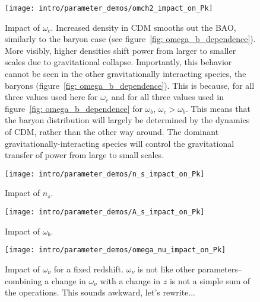 \begin{figure}[htb]
  \centering
  \texttt{[image: intro/parameter\_demos/omch2\_impact\_on\_Pk]}
  \caption[Impact of $\omega_c$ on $P(k)$]{Impact of $\omega_c$. Increased
  	density in CDM smooths out the BAO, similarly to the baryon case
  	(see figure~\ref{fig: omega_b_dependence}). More visibly, higher
  	densities shift power from larger to smaller scales due to gravitational 
  	collapse. Importantly, this behavior cannot be seen in the other
  	gravitationally interacting species, the baryons
  	(figure~\ref{fig: omega_b_dependence}). This is because, for all three
  	values used here for $\omega_c$ and for all three values used in
  	figure~\ref{fig: omega_b_dependence} for $\omega_b$,
  	$\omega_c > \omega_b$. This means that the baryon distribution will
  	largely be determined by the dynamics of CDM, rather than the
  	other way around. The dominant gravitationally-interacting species will
  	control the gravitational transfer of power from large to small scales.}
  \label{fig: omega_c_dependence}
\end{figure}


\begin{figure}[htb]
  \centering
  \texttt{[image: intro/parameter\_demos/n\_s\_impact\_on\_Pk]}
  \caption[Impact of $n_s$ on $P(k)$]{Impact of $n_s$.}
  \label{fig: n_s_dependence}
\end{figure}

\begin{figure}[htb]
  \centering
  \texttt{[image: intro/parameter\_demos/A\_s\_impact\_on\_Pk]}
  \caption[Impact of $\omega_b$ on $P(k)$]{Impact of $\omega_b$.}
  \label{fig: A_s_dependence}
\end{figure}

\begin{figure}[htb]
  \centering
  \texttt{[image: intro/parameter\_demos/omega\_nu\_impact\_on\_Pk]}
  \caption[Impact of $\omega_\nu$ on $P(k)$]{Impact of $\omega_\nu$ for a
  	fixed redshift. $\omega_\nu$ is not like other parameters--combining
  	a change in $\omega_\nu$ with a change in $z$ is not a simple sum of the
  	operations. This sounds awkward, let's rewrite...}
  \label{fig: omega_nu_dependence}
\end{figure}


